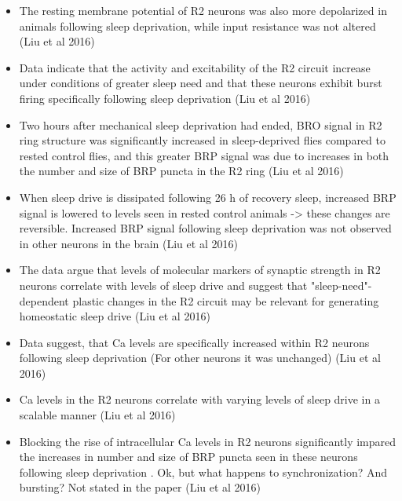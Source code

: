 \documentclass[11pt]{article}
\begin{document}
\begin{itemize}
    \item The resting membrane potential of R2 neurons
    was also more depolarized in animals following sleep deprivation, while input resistance was not altered \cite{liuSleepDriveEncoded2016}
    (Liu et al 2016)

    \item Data indicate that the activity and excitability of the R2 circuit increase under conditions of greater
    sleep need and that these neurons exhibit burst firing specifically following sleep deprivation \cite{liuSleepDriveEncoded2016}
    (Liu et al 2016)

    \item Two hours after mechanical sleep deprivation had ended, BRO signal in R2 ring structure was significantly increased in sleep-deprived
    flies compared to rested control flies, and this greater BRP signal was due to increases in both the number and size
    of BRP puncta in the R2 ring \cite{liuSleepDriveEncoded2016}
    (Liu et al 2016)

    \item When sleep drive is dissipated following 26 h of recovery sleep, increased BRP signal is lowered to levels seen in rested
    control animals -> these changes are reversible. Increased BRP signal following sleep
    deprivation was not observed in other neurons in the brain \cite{liuSleepDriveEncoded2016}
    (Liu et al 2016)

    \item The data argue that levels of molecular markers of synaptic strength in R2 neurons correlate with levels of sleep
    drive and suggest that "sleep-need"-dependent plastic changes in the R2 circuit may be relevant for generating
    homeostatic sleep drive \cite{liuSleepDriveEncoded2016}
    (Liu et al 2016)

    \item Data suggest, that Ca levels are specifically increased within R2 neurons following sleep deprivation (For other neurons
    it was unchanged) \cite{liuSleepDriveEncoded2016}
    (Liu et al 2016)

    \item Ca levels in the R2 neurons correlate with varying levels of sleep drive in a scalable manner \cite{liuSleepDriveEncoded2016}
    (Liu et al 2016)

    \item Blocking the rise of intracellular Ca levels in R2 neurons significantly impared the increases in number and size of BRP puncta
    seen in these neurons following sleep deprivation \cite{liuSleepDriveEncoded2016}.
    Ok, but what happens to synchronization? And bursting? Not stated in the paper
    (Liu et al 2016)


\end{itemize}
\end{document}
